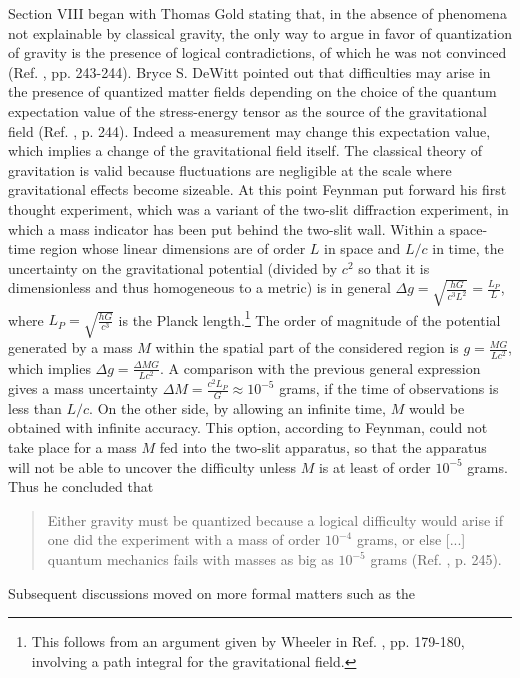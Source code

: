 \documentclass{ws-procs961x669}            %
\begin{document}
Section VIII began with Thomas Gold stating that, in the absence
of phenomena not explainable by classical gravity, the only way to
argue in favor of quantization of gravity is the presence of
logical contradictions, of which he was not convinced (Ref.
, pp. 243-244). Bryce S. DeWitt pointed out
that difficulties may arise in the presence of quantized matter
fields depending on the choice of the quantum expectation value of
the stress-energy tensor as the source of the gravitational field
(Ref. , p. 244). Indeed a measurement may
change this expectation value, which implies a change of the
gravitational field itself. The classical theory of gravitation is
valid because fluctuations are negligible at the scale where
gravitational effects become sizeable. At this point Feynman put
forward his first thought experiment, which was a variant of the
two-slit diffraction experiment, in which a mass indicator has
been put behind the two-slit wall. Within a space-time region
whose linear dimensions are of order $L$ in space and ${L}/{c}$ in
time, the uncertainty on the gravitational potential (divided by
$c^2$ so that it is dimensionless and thus homogeneous to a
metric) is in general $\Delta
g=\sqrt{\frac{hG}{c^3L^2}}=\frac{L_P}{L}$, where
$L_P=\sqrt{\frac{hG}{c^3}}$ is the Planck length.\footnote{This
follows from an argument given by Wheeler in Ref.
, pp. 179-180, involving a path integral for
the gravitational field.} The order of magnitude of the potential
generated by a mass $M$ within the spatial part of the considered
region is $g=\frac{MG}{Lc^2}$, which implies $\Delta
g=\frac{\Delta M G}{Lc^2}$. A comparison with the previous general
expression gives a mass uncertainty $\Delta M =\frac{c^2
L_P}{G}\approx 10^{-5}$ grams, if the time of observations is less
than ${L}/{c}$. On the other side, by allowing an infinite time,
$M$ would be obtained with infinite accuracy. This option,
according to Feynman, could not take place for a mass $M$ fed into
the two-slit apparatus, so that the apparatus will not be able to
uncover the difficulty unless $M$ is at least of order $10^{-5}$
grams. Thus he concluded that
%
\begin{quote}
Either gravity must be quantized because a logical difficulty
would arise if one did the experiment with a mass of order
$10^{-4}$ grams, or else [...] quantum mechanics fails with masses
as big as $10^{-5}$ grams (Ref. , p. 245).
\end{quote}
%
Subsequent discussions moved on more formal matters such as the
\end{document}
